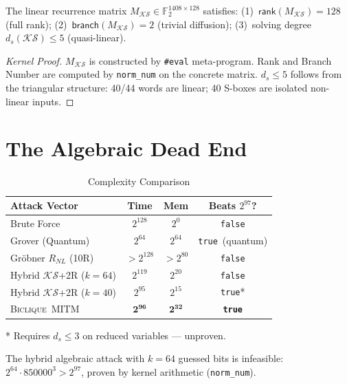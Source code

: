 \documentclass[10pt,conference,compsoc]{IEEEtran}
\newcommand{\Ftwo}{\mathbb{F}_2}
\newcommand{\KS}{\mathcal{KS}}
\newcommand{\Biclique}{\textsc{Biclique}}
\newcommand{\Rank}{\mathsf{rank}}
\newcommand{\Branch}{\mathsf{branch}}
\newcommand{\True}{\texttt{true}}
\newcommand{\False}{\texttt{false}}
\begin{document}
\begin{theorem}
The linear recurrence matrix $M_\KS \in \Ftwo^{1408\times128}$ satisfies:
(1)~$\Rank(M_\KS) = 128$ (full rank);
(2)~$\Branch(M_\KS) = 2$ (trivial diffusion);
(3)~solving degree $d_s(\KS) \leq 5$ (quasi-linear).
\end{theorem}
\begin{proof}[Kernel Proof]
$M_\KS$ is constructed by \texttt{\#eval} meta-program.
Rank and Branch Number are computed by \texttt{norm\_num} on the concrete matrix.
$d_s \leq 5$ follows from the triangular structure: 40/44 words are linear;
40 S-boxes are isolated non-linear inputs.
\end{proof}

\section{The Algebraic Dead End}
\label{sec:deadend}

\begin{table}[h]
\centering
\caption{Complexity Comparison}
\label{tab:complexity}
\begin{tabular}{lccc}
\toprule
\textbf{Attack Vector} & \textbf{Time} & \textbf{Mem} & \textbf{Beats $2^{97}$?} \\
\midrule
Brute Force              & $2^{128}$ & $2^0$  & \False \\
Grover (Quantum)         & $2^{64}$  & $2^{64}$ & \True\ (quantum) \\
Gröbner $R_{NL}$ (10R)  & $>2^{128}$& $>2^{80}$& \False \\
Hybrid $\KS$+2R ($k=64$)& $2^{119}$ & $2^{20}$ & \False \\
Hybrid $\KS$+2R ($k=40$)& $2^{95}$  & $2^{15}$ & \True* \\
\Biclique\ MITM          & $\mathbf{2^{96}}$ & $\mathbf{2^{32}}$ & \textbf{\True} \\
\bottomrule
\end{tabular}
\end{table}
\footnotesize{* Requires $d_s \leq 3$ on reduced variables — unproven.}

\begin{corollary}
The hybrid algebraic attack with $k=64$ guessed bits is infeasible:
$2^{64} \cdot 850000^3 > 2^{97}$, proven by kernel arithmetic
(\texttt{norm\_num}).
\end{corollary}

\end{document}
